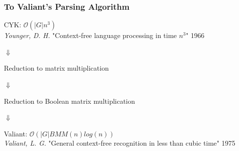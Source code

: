 \documentclass[xcolor=table]{beamer}
\begin{document}
\begin{frame}[fragile] \frametitle{To Valiant's Parsing Algorithm}

    \begin{center}
        
    CYK: $\mathcal{O}(|G|n^3)$  \\
    \emph{Younger, D. H.} "Context-free language processing in time $n^3$" 1966
    
    $\Downarrow$ 
    
    Reduction to matrix multiplication 
    
    $\Downarrow $
    
    Reduction to Boolean matrix multiplication 
    
    $\Downarrow$ 
    
    Valiant: $\mathcal{O}(|G|BMM(n)log(n))$ \\
    \emph{Valiant, L. G.} "General context-free recognition in less than cubic time" 1975
    
    \end{center}


\end{frame}
\end{document}
